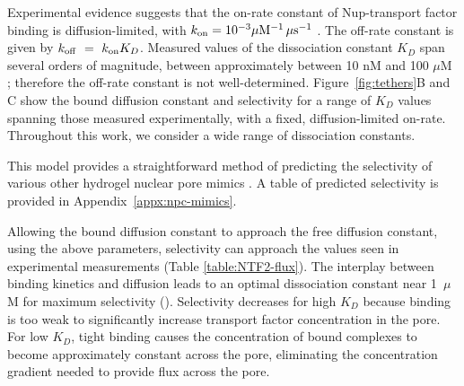 Experimental evidence suggests that the on-rate constant of Nup-transport factor binding is diffusion-limited, with $k_{\rm on} = 10^{-3}\mu \mathrm{M}^{-1} \, \mu \mathrm{s}^{-1}$ \cite{milles15, hough15}.  The off-rate constant is given by $k_{\rm off} ~=~k_{\rm on} K_D$.  Measured values of the dissociation constant $K_D$ span several orders of magnitude, between approximately between 10 nM and 100 $\mu$M \cite{pyhtila03, gilchrist02, tetenbaum-novatt12-1, milles15, timney16, vovk16, hayama18}; therefore the off-rate constant is not well-determined.  Figure~\ref{fig:tethers}B and C show the bound diffusion constant and selectivity for a range of $K_D$ values spanning those measured experimentally, with a fixed, diffusion-limited on-rate.  Throughout this work, we consider a wide range of dissociation constants.

This model provides a straightforward method of predicting the selectivity of various other hydrogel nuclear pore mimics \cite{frey09,ader10,frey07,kim15}.  A table of predicted selectivity is provided in Appendix~\ref{appx:npc-mimics}.

Allowing the bound diffusion constant to approach the free diffusion constant, using the above parameters, selectivity can approach the values seen in experimental measurements (Table \ref{table:NTF2-flux}).  The interplay between binding kinetics and diffusion leads to an optimal dissociation constant near 1~$\mu$M for maximum selectivity (). Selectivity decreases for high $K_D$ because binding is too weak to
significantly increase transport factor concentration in the pore.  For low $K_D$, tight binding causes the concentration of bound complexes to become approximately constant across the pore, eliminating the concentration gradient needed to provide flux across the pore.


